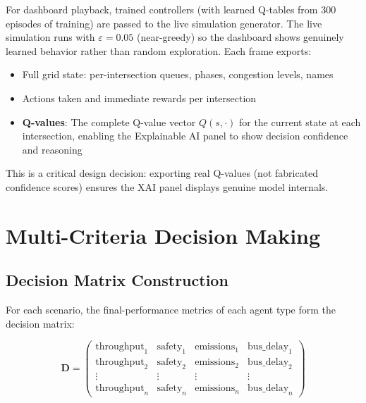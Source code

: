 \documentclass[12pt, a4paper]{article}
\begin{document}
For dashboard playback, trained controllers (with learned Q-tables from 300 episodes of training) are passed to the live simulation generator. The live simulation runs with $\varepsilon = 0.05$ (near-greedy) so the dashboard shows genuinely learned behavior rather than random exploration. Each frame exports:
\begin{itemize}[nosep]
    \item Full grid state: per-intersection queues, phases, congestion levels, names
    \item Actions taken and immediate rewards per intersection
    \item \textbf{Q-values}: The complete Q-value vector $Q(s, \cdot)$ for the current state at each intersection, enabling the Explainable AI panel to show decision confidence and reasoning
\end{itemize}

This is a critical design decision: exporting real Q-values (not fabricated confidence scores) ensures the XAI panel displays genuine model internals.

\section{Multi-Criteria Decision Making}

\subsection{Decision Matrix Construction}

For each scenario, the final-performance metrics of each agent type form the decision matrix:

\begin{equation}
    \mathbf{D} =
    \begin{pmatrix}
        \text{throughput}_1 & \text{safety}_1 & \text{emissions}_1 & \text{bus\_delay}_1 \\
        \text{throughput}_2 & \text{safety}_2 & \text{emissions}_2 & \text{bus\_delay}_2 \\
        \vdots & \vdots & \vdots & \vdots \\
        \text{throughput}_n & \text{safety}_n & \text{emissions}_n & \text{bus\_delay}_n
    \end{pmatrix}
\end{equation}
\end{document}

